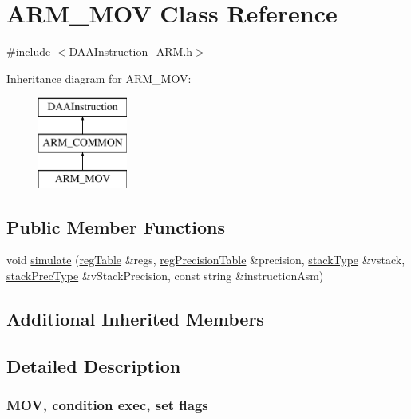 \hypertarget{classARM__MOV}{}\section{A\+R\+M\+\_\+\+M\+OV Class Reference}
\label{classARM__MOV}


{\ttfamily \#include $<$D\+A\+A\+Instruction\+\_\+\+A\+R\+M.\+h$>$}

Inheritance diagram for A\+R\+M\+\_\+\+M\+OV\+:\begin{figure}[H]
\begin{center}
\leavevmode
\includegraphics[height=3.000000cm]{classARM__MOV}
\end{center}
\end{figure}
\subsection*{Public Member Functions}
\begin{DoxyCompactItemize}
\item 
void \hyperlink{classARM__MOV_acbf1dba49a5e4d834e41d5e834ff7e5a}{simulate} (\hyperlink{DAAInstruction_8h_af0fae93a861de9cf37988d5673cac523}{reg\+Table} \&regs, \hyperlink{DAAInstruction_8h_a0e8cae02815a5f8adc750122d790b455}{reg\+Precision\+Table} \&precision, \hyperlink{DAAInstruction_8h_a1b0e70ac1a04f06c8132055ed01f589f}{stack\+Type} \&vstack, \hyperlink{DAAInstruction_8h_ac5cb793e9dac3fa9693da78b7e29ab30}{stack\+Prec\+Type} \&v\+Stack\+Precision, const string \&instruction\+Asm)
\end{DoxyCompactItemize}
\subsection*{Additional Inherited Members}


\subsection{Detailed Description}


 \subsubsection*{M\+OV, condition exec, set flags }

